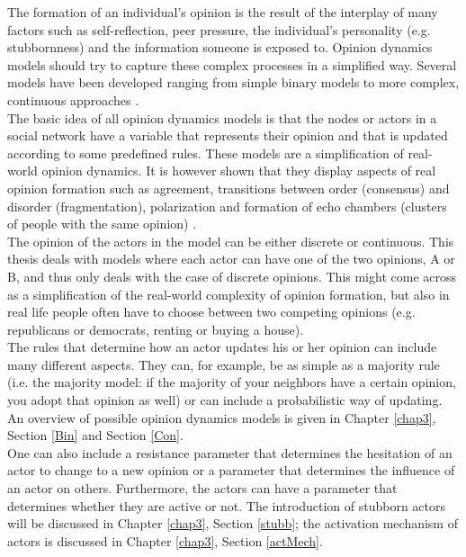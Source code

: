 \documentclass[11 pt , letterpaper , twoside , openright]{book}
\begin{document}
The formation of an individual's opinion is the result of the interplay of many factors such as self-reflection, peer pressure, the individual's personality (e.g. stubbornness) and the information someone is exposed to. Opinion dynamics models should try to capture these complex processes in a simplified way. Several models have been developed ranging from simple binary models to more complex, continuous approaches \cite{Sirbu2016}.\\
\newline
The basic idea of all opinion dynamics models is that the nodes or actors in a social network have a variable that represents their opinion and that is updated according to some predefined rules. These models are a simplification of real-world opinion dynamics. It is however shown that they display aspects of real opinion formation such as agreement, transitions between order (consensus) and disorder (fragmentation), polarization and formation of echo chambers (clusters of people with the same opinion) \cite{Sirbu2016}. \\
\newline
The opinion of the actors in the model can be either discrete or continuous. This thesis deals with models where each actor can have one of the two opinions, A or B, and thus only deals with the case of discrete opinions. This might come across as a simplification of the real-world complexity of opinion formation, but also in real life people often have to choose between two competing opinions (e.g. republicans or democrats, renting or buying a house). \\
\newline
The rules that determine how an actor updates his or her opinion can include many different aspects. They can, for example, be as simple as a majority rule (i.e. the majority model: if the majority of your neighbors have a certain opinion, you adopt that opinion as well) or can include a probabilistic way of updating. An overview of possible opinion dynamics models is given in Chapter \ref{chap3}, Section \ref{Bin} and Section \ref{Con}. \\
\newline
One can also include a resistance parameter that determines the hesitation of an actor to change to a new opinion or a parameter that determines the influence of an actor on others. Furthermore, the actors can have a parameter that determines whether they are active or not. The introduction of stubborn actors will be discussed in Chapter \ref{chap3}, Section \ref{stubb}; the activation mechanism of actors is discussed in Chapter \ref{chap3}, Section \ref{actMech}.\\
\end{document}
